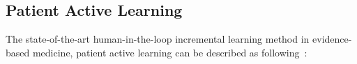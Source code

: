 \documentclass[final,twocolumn,5p]{elsarticle}
\theoremstyle{break}
\begin{document}


\subsection{Patient Active Learning}
\label{sect: Patient Active Learning}

The state-of-the-art human-in-the-loop incremental learning method in evidence-based medicine, patient active learning can be described as following~\cite{wallace2010semi}:
\end{document}
